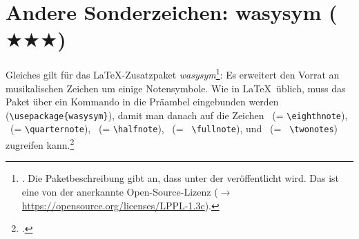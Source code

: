 %
%
%



\section{Andere Sonderzeichen: wasysym ($\bigstar\bigstar\bigstar$)}

Gleiches gilt für das \LaTeX-Zusatzpaket
\textit{wasysym}\footnote{\cite[vgl.][\nopage wp]{CtanWasysym2018a}.
Die Paketbeschreibung gibt an, dass  unter der  veröffentlicht wird. Das ist eine von der  anerkannte
Open-Source-Lizenz ($\rightarrow$
\href{https://opensource.org/licenses/LPPL-1.3c}
{https://opensource.org/licenses/LPPL-1.3c}).}: Es erweitert den Vorrat an
musikalischen Zeichen um einige Notensymbole. Wie in \LaTeX\ üblich, muss das
Paket über ein Kommando in
die Präambel eingebunden werden
(\texttt{\textbackslash{usepackage\{wasysym\}}}), damit man danach auf die
Zeichen \eighthnote \ (= \texttt{\small \textbackslash{eighthnote}}),
\quarternote \ (= \texttt{\small \textbackslash{quarternote}}), \halfnote \ (=
\texttt{\small \textbackslash{halfnote}}), \fullnote \ (= \texttt{\small
\textbackslash{fullnote}}), und \twonotes \ (= \texttt{\small
\textbackslash{twonotes}}) zugreifen kann.\footcite[vgl.][2]{Kielhorn2003a}

